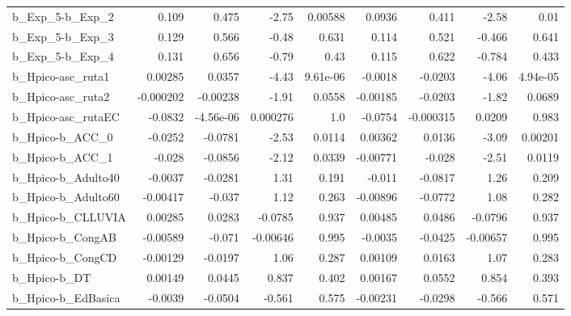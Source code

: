 \begin{tabular}{lrrrrrrrr}
b\_Exp\_5-b\_Exp\_2            &       0.109 &        0.475 &     -2.75 &  0.00588 &     0.0936 &       0.411 &        -2.58 &          0.01 \\
b\_Exp\_5-b\_Exp\_3            &       0.129 &        0.566 &     -0.48 &    0.631 &      0.114 &       0.521 &       -0.466 &         0.641 \\
b\_Exp\_5-b\_Exp\_4            &       0.131 &        0.656 &     -0.79 &     0.43 &      0.115 &       0.622 &       -0.784 &         0.433 \\
b\_Hpico-asc\_ruta1          &     0.00285 &       0.0357 &     -4.43 & 9.61e-06 &    -0.0018 &     -0.0203 &        -4.06 &      4.94e-05 \\
b\_Hpico-asc\_ruta2          &   -0.000202 &     -0.00238 &     -1.91 &   0.0558 &   -0.00185 &     -0.0203 &        -1.82 &        0.0689 \\
b\_Hpico-asc\_rutaEC         &     -0.0832 &    -4.56e-06 &  0.000276 &      1.0 &    -0.0754 &   -0.000315 &       0.0209 &         0.983 \\
b\_Hpico-b\_ACC\_0            &     -0.0252 &      -0.0781 &     -2.53 &   0.0114 &    0.00362 &      0.0136 &        -3.09 &       0.00201 \\
b\_Hpico-b\_ACC\_1            &      -0.028 &      -0.0856 &     -2.12 &   0.0339 &   -0.00771 &      -0.028 &        -2.51 &        0.0119 \\
b\_Hpico-b\_Adulto40         &     -0.0037 &      -0.0281 &      1.31 &    0.191 &     -0.011 &     -0.0817 &         1.26 &         0.209 \\
b\_Hpico-b\_Adulto60         &    -0.00417 &       -0.037 &      1.12 &    0.263 &   -0.00896 &     -0.0772 &         1.08 &         0.282 \\
b\_Hpico-b\_CLLUVIA          &     0.00285 &       0.0283 &   -0.0785 &    0.937 &    0.00485 &      0.0486 &      -0.0796 &         0.937 \\
b\_Hpico-b\_CongAB           &    -0.00589 &       -0.071 &  -0.00646 &    0.995 &    -0.0035 &     -0.0425 &     -0.00657 &         0.995 \\
b\_Hpico-b\_CongCD           &    -0.00129 &      -0.0197 &      1.06 &    0.287 &    0.00109 &      0.0163 &         1.07 &         0.283 \\
b\_Hpico-b\_DT               &     0.00149 &       0.0445 &     0.837 &    0.402 &    0.00167 &      0.0552 &        0.854 &         0.393 \\
b\_Hpico-b\_EdBasica         &     -0.0039 &      -0.0504 &    -0.561 &    0.575 &   -0.00231 &     -0.0298 &       -0.566 &         0.571 \\

\end{tabular}
